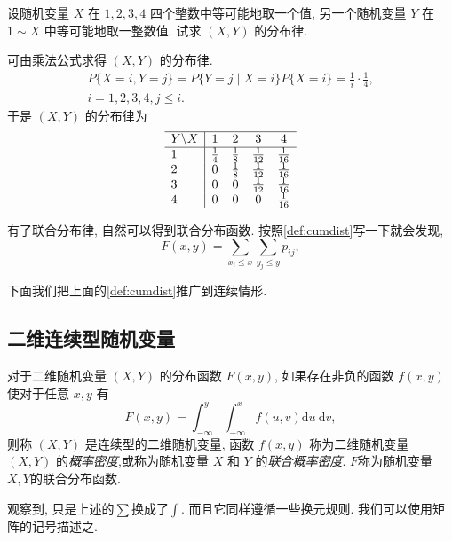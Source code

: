     \begin{example}
      设随机变量 $X$ 在 $1,2,3,4$ 四个整数中等可能地取一个值, 另一个随机变量 $Y$ 在 $1 \sim X$ 中等可能地取一整数值. 试求 $(X, Y)$ 的分布律.
    \end{example}
    \begin{solution}
      {可由乘法公式求得 $(X, Y)$ 的分布律.}
        { $$
            \begin{gathered}
                P\{X=i, Y=j\}=P\{Y=j \mid X=i\} P\{X=i\}=\frac{1}{i} \cdot \frac{1}{4}, \\
                i=1,2,3,4, j \leqslant i .
            \end{gathered}
        $$}
        {于是 $(X, Y)$ 的分布律为}
        $$
            \begin{array}{l|cccc}
                \hline Y \backslash X   & 1           & 2           & 3            & 4            \\
                \hline 1 & \frac{1}{4} & \frac{1}{8} & \frac{1}{12} & \frac{1}{16} \\
                2        & 0           &\frac{1}{8}   &\frac{1}{12} &
                \frac{1}{16}\\
                3        & 0           & 0            &\frac{1}{12} & \frac{1}{16} \\
                4        & 0           & 0            & 0            & \frac{1}{16} \\
                \hline
            \end{array}
        $$
    \end{solution}
    有了联合分布律, 自然可以得到联合分布函数. 按照\cref{def:cumdist}写一下就会发现, 
    $$
        F(x, y)=\sum_{x_i \leqslant x} \sum_{y_j \leqslant y} p_{i j},
    $$
    
    下面我们把上面的\cref{def:cumdist}推广到连续情形.

    \subsection{二维连续型随机变量}
    \begin{definition}
      对于二维随机变量 $(X, Y)$ 的分布函数 $F(x, y)$, 如果存在非负的函数 $f(x, y)$ 使对于任意 $x, y$ 有
      $$
          F(x, y)=\int_{-\infty}^y \int_{-\infty}^x f(u, v) \mathrm{d} u \mathrm{~d} v,
      $$
      则称 $(X, Y)$ 是连续型的二维随机变量, 函数 $f(x, y)$ 称为二维随机变量 $(X, Y)$ 的\emph{概率密度},或称为随机变量 $X$ 和 $Y$ 的\emph{联合概率密度}. $F$称为随机变量$X, Y$的联合分布函数. 
  \end{definition}
  观察到, 只是上述的$\sum$换成了$\int$. 而且它同样遵循一些换元规则. 我们可以使用矩阵的记号描述之. 



